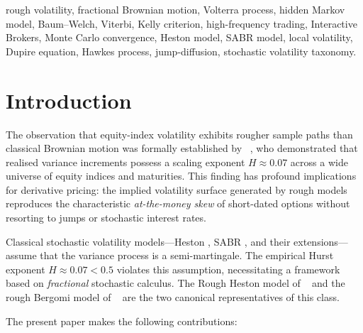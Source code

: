\documentclass[conference]{IEEEtran}
\begin{document}
\begin{IEEEkeywords}
rough volatility, fractional Brownian motion, Volterra process, hidden
Markov model, Baum--Welch, Viterbi, Kelly criterion, high-frequency
trading, Interactive Brokers, Monte Carlo convergence, Heston model,
SABR model, local volatility, Dupire equation, Hawkes process,
jump-diffusion, stochastic volatility taxonomy.
\end{IEEEkeywords}

\section{Introduction}\label{sec:intro}

The observation that equity-index volatility exhibits rougher sample
paths than classical Brownian motion was formally established by
\citeauthor{gatheral2018volatility}~\cite{gatheral2018volatility},
who demonstrated that realised variance increments possess a scaling
exponent $H \approx 0.07$ across a wide universe of equity indices
and maturities.  This finding has profound implications for derivative
pricing: the implied volatility surface generated by rough models
reproduces the characteristic \emph{at-the-money skew} of short-dated
options without resorting to jumps or stochastic interest rates.

Classical stochastic volatility models—Heston \cite{heston1993closed},
SABR \cite{hagan2002managing}, and their extensions—assume that the
variance process is a semi-martingale.  The empirical Hurst exponent
$H \approx 0.07 < 0.5$ violates this assumption, necessitating a
framework based on \emph{fractional} stochastic calculus.  The Rough
Heston model of \citeauthor{el2019roughening}~\cite{el2019roughening}
and the rough Bergomi model of
\citeauthor{bayer2016pricing}~\cite{bayer2016pricing} are the two
canonical representatives of this class.

The present paper makes the following contributions:
\end{document}
